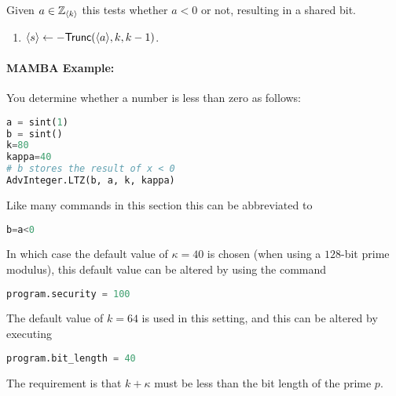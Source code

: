 \iffalse
\note{Nigel}{Does not seem to be used anywhere}
\msubsubsection{$\mathsf{Mod}(\sshare{a},k,x)$:}
Given $a \in \Zk$ and public $x \in [1,\ldots,2^{k-1}-1]$
this computes $\sshare{a \pmod{x}}$.
\begin{enumerate}
\item $m \asn \ceil{\log_2 x }$.
\item $\sshare{r'}, \sshare{r}, \sshare{r}_B \asn \mathsf{PRandM}(k,m,\kappa)$.
\item $c \asn \Open(\sshare{a}+2^{k-1}+\sshare{r}+x \cdot \sshare{r'})$.
\item $c' \asn c \pmod{x}$.
\item $\sshare{v} \asn 1 -\mathsf{BitLT}(\sshare{r}_B,x)$.
\item $\sshare{u} \asn \mathsf{LTZ}(c' - \sshare{r} + x \cdot \sshare{v},m)$.
\item $\sshare{a'} \asn c' - \sshare{r} + x \cdot ( \sshare{v}+\sshare{u})$.
\item Return $\sshare{a'}$.
\end{enumerate}
\fi

Given $a \in \Zk$ this tests whether $a<0$ or not,
resulting in a shared bit.
\begin{enumerate}
\item $\langle s \rangle \leftarrow - \mathsf{Trunc}(\langle a \rangle,k,k-1)$.
\end{enumerate}

\paragraph{MAMBA Example:} You determine whether a number is less than zero as follows: 
\begin{lstlisting}[language={python}]
a = sint(1)
b = sint()
k=80
kappa=40
# b stores the result of x < 0
AdvInteger.LTZ(b, a, k, kappa)
\end{lstlisting}
Like many commands in this section this can be abbreviated to
\begin{lstlisting}[language={python}]
b=a<0
\end{lstlisting}
In which case the default value of $\kappa=40$ is chosen
(when using a $128$-bit prime modulus), this default value can be 
altered by using the command
\begin{lstlisting}[language={python}]
program.security = 100
\end{lstlisting}
The default value of $k=64$ is used in this setting, and
this can be altered by executing
\begin{lstlisting}[language={python}]
program.bit_length = 40
\end{lstlisting}
The requirement is that $k+\kappa$ must be less than the bit length
of the prime $p$.


